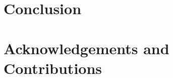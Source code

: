 \documentclass[10pt, conference, compsocconf]{IEEEtran}
\begin{document}
\section{Conclusion}
\label{sec:conclusion}


\section{Acknowledgements and Contributions}
\label{sec:ack}





\end{document}
